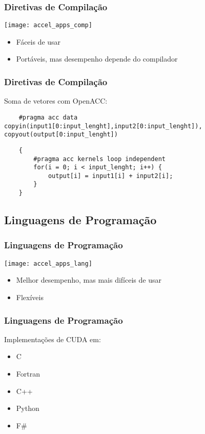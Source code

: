 \documentclass[10pt, compress, aspectratio=43, xcolor={table,usenames,dvipsnames}]{beamer}
\begin{document}
\begin{frame}
    \frametitle{Diretivas de Compilação}
    \begin{center}
        \texttt{[image: accel\_apps\_comp]}
    \end{center}

    \begin{itemize}
        \item Fáceis de usar
        \item Portáveis, mas desempenho depende do compilador
    \end{itemize}
\end{frame}

\begin{frame}[fragile]
    \frametitle{Diretivas de Compilação}
    Soma de vetores com \alert{OpenACC}:
    \begin{verbatim}
    #pragma acc data copyin(input1[0:input_lenght],input2[0:input_lenght]), copyout(output[0:input_lenght])
    \end{verbatim}

    \begin{verbatim}
    {
        #pragma acc kernels loop independent
        for(i = 0; i < input_lenght; i++) {
            output[i] = input1[i] + input2[i];
        }
    }
    \end{verbatim}
\end{frame}

\subsection{Linguagens de Programação}

\begin{frame}
    \frametitle{Linguagens de Programação}
    \begin{center}
        \texttt{[image: accel\_apps\_lang]}
    \end{center}

    \begin{itemize}
        \item Melhor desempenho, mas mais difíceis de usar
        \item Flexíveis
    \end{itemize}
\end{frame}

\begin{frame}
    \frametitle{Linguagens de Programação}
    Implementações de CUDA em:
    \begin{itemize}
        \item \alert{C}
        \item Fortran
        \item C++
        \item Python
        \item F\#
    \end{itemize}
\end{frame}
\end{document}
